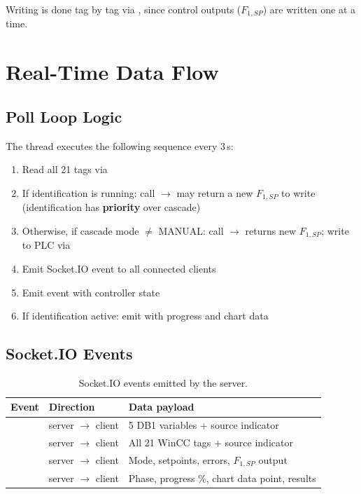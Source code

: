 Writing is done tag by tag via , since control outputs
($F_{1,SP}$) are written one at a time.

\section{Real-Time Data Flow}

\subsection{Poll Loop Logic}

The  thread executes the following sequence every 3\,s:

\begin{enumerate}[leftmargin=*, itemsep=3pt]
  \item Read all 21 tags via 
  \item If identification is running: call  $\rightarrow$ may return
    a new $F_{1,SP}$ to write (identification has \textbf{priority} over cascade)
  \item Otherwise, if cascade mode $\neq$ MANUAL: call  $\rightarrow$
    returns new $F_{1,SP}$; write to PLC via 
  \item Emit  Socket.IO event to all connected clients
  \item Emit  event with controller state
  \item If identification active: emit  with progress and chart data
\end{enumerate}

\subsection{Socket.IO Events}

\begin{table}[H]
  \centering
  \caption{Socket.IO events emitted by the server.}
  \label{tab:socketio}
  \begin{tabular}{@{}L{3.0cm}L{3.0cm}L{7.0cm}@{}}
    \toprule
    \textbf{Event} & \textbf{Direction} & \textbf{Data payload} \\
    \midrule
      & server $\to$ client & 5 DB1 variables + source indicator \\
      & server $\to$ client & All 21 WinCC tags + source indicator \\
      & server $\to$ client & Mode, setpoints, errors, $F_{1,SP}$ output \\
      & server $\to$ client & Phase, progress \%, chart data point, results \\
    \bottomrule
  \end{tabular}
\end{table}

